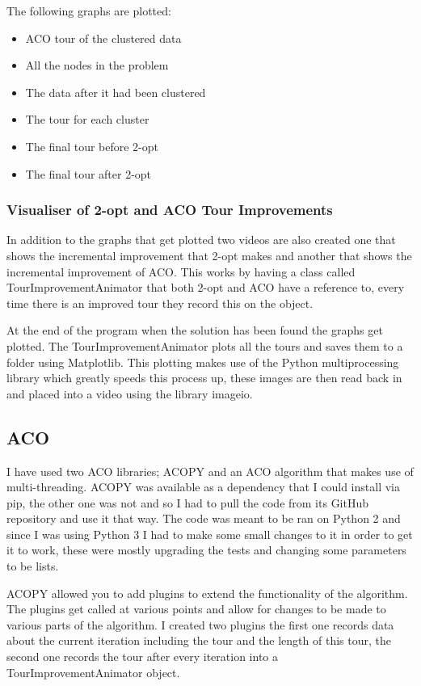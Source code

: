 The following graphs are plotted:

\begin{itemize}
    \item ACO tour of the clustered data
    \item All the nodes in the problem
    \item The data after it had been clustered
    \item The tour for each cluster
    \item The final tour before 2-opt
    \item The final tour after 2-opt
\end{itemize}

\subsubsection{Visualiser of 2-opt and ACO Tour Improvements}

In addition to the graphs that get plotted two videos are also created one that shows the incremental improvement that 2-opt makes and another that shows the incremental improvement of ACO. This works by having a class called TourImprovementAnimator that both 2-opt and ACO have a reference to, every time there is an improved tour they record this on the object.

At the end of the program when the solution has been found the graphs get plotted. The TourImprovementAnimator plots all the tours and saves them to a folder using Matplotlib\cite{matplotlib}. This plotting makes use of the Python multiprocessing library which greatly speeds this process up, these images are then read back in and placed into a video using the library imageio\cite{imageio}.

\subsection{ACO}

I have used two ACO libraries; ACOPY\cite{acopy} and an ACO algorithm that makes use of multi-threading\cite{multithreaded_aco}. ACOPY was available as a dependency that I could install via pip, the other one was not and so I had to pull the code from its GitHub repository and use it that way. The code was meant to be ran on Python 2 and since I was using Python 3 I had to make some small changes to it in order to get it to work, these were mostly upgrading the tests and changing some parameters to be lists. 

ACOPY allowed you to add plugins to extend the functionality of the algorithm. The plugins get called at various points and allow for changes to be made to various parts of the algorithm. I created two plugins the first one records data about the current iteration including the tour and the length of this tour, the second one records the tour after every iteration into a TourImprovementAnimator object.

